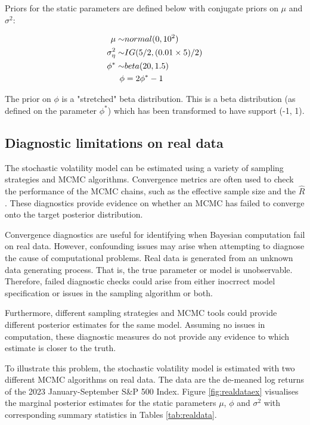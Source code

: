 \documentclass[12pt, a4paper]{article}
\begin{document}
    Priors for the static parameters are defined below with conjugate priors on $\mu$ and $\sigma^2$:

    $$
    \begin{aligned}
    \mu \sim& \space normal(0, 10^2) \\
    \sigma_{\eta}^2 \sim& \space IG(5/2, (0.01\times 5) / 2) \\
    \phi^{\ast} \sim& \space beta(20, 1.5) \\
    \phi &=  2\phi^{\ast} - 1
    \end{aligned}
    $$

    The prior on $\phi$ is a "stretched" beta distribution. This is a beta distribution (as defined on the parameter $\phi^*$) which has been transformed to have support (-1, 1).


\subsection{Diagnostic limitations on real data}
    The stochastic volatility model can be estimated using a variety of sampling strategies and MCMC algorithms. Convergence metrics are often used to check the performance of the MCMC chains, such as the effective sample size and the $\hat{R}$. These diagnostics provide evidence on whether an MCMC has failed to converge onto the target posterior distribution.

    Convergence diagnostics are useful for identifying when Bayesian computation fail on real data. However, confounding issues may arise when attempting to diagnose the cause of computational problems. Real data is generated from an unknown data generating process. That is, the true parameter or model is unobservable. Therefore, failed diagnostic checks could arise from either inocrrect model specification or issues in the sampling algorithm or both.

    Furthermore, different sampling strategies and MCMC tools could provide different posterior estimates for the same model. Assuming no issues in computation, these diagnostic measures do not provide any evidence to which estimate is closer to the truth.

    To illustrate this problem, the stochastic volatility model is estimated with two different MCMC algorithms on real data. The data are the de-meaned log returns of the 2023 January-September S\&P 500 Index. Figure \ref{fig:realdataex} visualises the marginal posterior estimates for the static parameters $\mu$, $\phi$ and $\sigma^2$ with corresponding summary statistics in Tables \ref{tab:realdata}.
\end{document}
